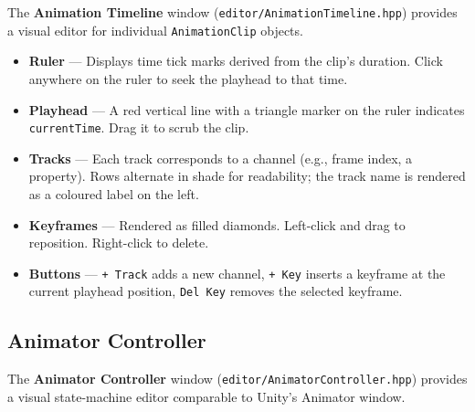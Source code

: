 The \textbf{Animation Timeline} window (\texttt{editor/AnimationTimeline.hpp})
provides a visual editor for individual \texttt{AnimationClip} objects.

\begin{itemize}[noitemsep]
  \item \textbf{Ruler} — Displays time tick marks derived from the clip's
        duration. Click anywhere on the ruler to seek the playhead to that
        time.
  \item \textbf{Playhead} — A red vertical line with a triangle marker on the
        ruler indicates \texttt{currentTime}. Drag it to scrub the clip.
  \item \textbf{Tracks} — Each track corresponds to a channel (e.g., frame
        index, a property). Rows alternate in shade for readability; the
        track name is rendered as a coloured label on the left.
  \item \textbf{Keyframes} — Rendered as filled diamonds. Left-click and drag
        to reposition. Right-click to delete.
  \item \textbf{Buttons} — \texttt{+ Track} adds a new channel,
        \texttt{+ Key} inserts a keyframe at the current playhead position,
        \texttt{Del Key} removes the selected keyframe.
\end{itemize}

\subsection{Animator Controller}

The \textbf{Animator Controller} window
(\texttt{editor/AnimatorController.hpp}) provides a visual state-machine
editor comparable to Unity's Animator window.


